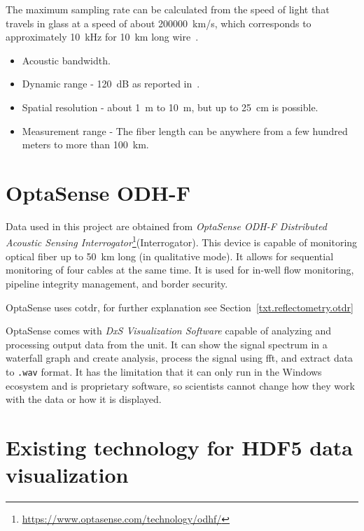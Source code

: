 The maximum sampling rate can be calculated from the speed of light that travels in glass at a speed of about \qty{200000}{\km/\s}, which corresponds to approximately \qty{10}{\kHz} for \qty{10}{\km} long wire~\cite{WangYu2017RDVM}.


\begin{itemize}
    \item Acoustic bandwidth.
    \item Dynamic range - \qty{120}{\dB} as reported in~\cite{dasseismic}.
    \item Spatial resolution - about \qty{1}{\m} to \qty{10}{\m}, but up to \qty{25}{\cm} is possible.
    \item Measurement range - The fiber length can be anywhere from a few hundred meters to more than \qty{100}{\km}.
\end{itemize}


\section{OptaSense ODH-F}\label{txt.optasense}

Data used in this project are obtained from \textit{OptaSense ODH-F Distributed Acoustic Sensing Interrogator}\footnote{\url{https://www.optasense.com/technology/odhf/}}(Interrogator). This device is capable of monitoring optical fiber up to \qty{50}{\km} long (in qualitative mode). It allows for sequential monitoring of four cables at the same time. It is used for in-well flow monitoring, pipeline integrity management, and border security. 

OptaSense uses \ac{cotdr}, for further explanation see Section~\ref{txt.reflectometry.otdr}


OptaSense comes with \textit{DxS Visualization Software} capable of analyzing and processing output data from the unit. It can show the signal spectrum in a waterfall graph and create analysis, process the signal using \ac{fft}, and extract data to \verb|.wav| format. It has the limitation that it can only run in the Windows ecosystem and is proprietary software, so scientists cannot change how they work with the data or how it is displayed.

\section{Existing technology for HDF5 data visualization}\label{txt.design.existing}


